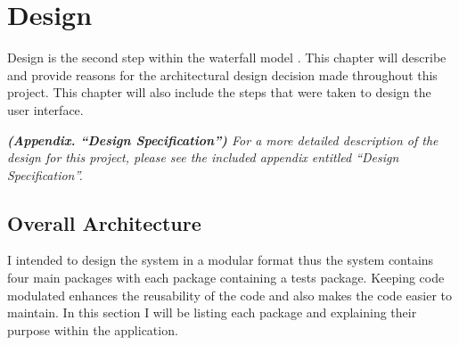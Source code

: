 \chapter{Design}

Design is the second step within the waterfall model \cite{waterfall}. This chapter will describe and provide reasons for the architectural design decision made throughout this project. This chapter will also include the steps that were taken to design the user interface.

\textit{\textbf{(Appendix. “Design Specification”)} For a more detailed description of the design for this project, please see the included appendix entitled “Design Specification”.} 

\section{Overall Architecture}
I intended to design the system in a modular format thus the system contains four main packages with each package containing a tests package. Keeping code modulated enhances the reusability of the code and also makes the code easier to maintain. In this section I will be listing each package and explaining their purpose within the application.


